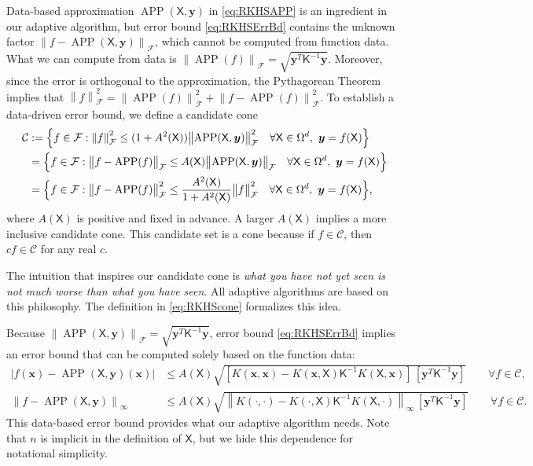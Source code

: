 \documentclass[]{mcom-l}
\theoremstyle{remark}
\DeclareMathOperator{\APP}{APP}
\newcommand{\mK}{\mathsf{K}}
\newcommand{\mX}{\mathsf{X}}
\newcommand{\bx}{{\boldsymbol{x}}}
\newcommand{\by}{{\boldsymbol{y}}}
\newcommand{\calc}{{\mathcal{C}}}
\newcommand{\calf}{{\mathcal{F}}}
\def\abs#1{\ensuremath{\left \lvert #1 \right \rvert}}
\newcommand{\norm}[2][{}]{\ensuremath{\left \lVert #2 \right \rVert}_{#1}}
\newcommand{\bignorm}[2][{}]{\ensuremath{\bigl \lVert #2 \bigr \rVert}_{#1}}
\begin{document}
Data-based approximation $\APP(\mX,\by)$ in \eqref{eq:RKHSAPP} is an ingredient in our adaptive algorithm, but error bound \eqref{eq:RKHSErrBd} contains the unknown factor $\norm[\calf]{f - \APP(\mX,\by)}$, which cannot be computed from function data.  What we can compute from data is $\bignorm[\calf]{\APP(f)} = \sqrt{\by^T \mK^{-1} \by}$.  Moreover, since the error is orthogonal to the approximation,  the Pythagorean Theorem implies that $\norm[\calf]{f}^2  = \bignorm[\calf]{\APP(f)}^2 + \bignorm[\calf]{f - \APP(f)}^2$.  To establish a data-driven error bound, we define a candidate cone
\begin{align} \label{eq:RKHScone}
\calc &:= \Bigl\{f \in \calf : \norm[\calf]{f}^2 \le (1 + A^2(\mX)) \bignorm[\calf]{\APP(\mX,\by)}^2 \quad \forall \mX \in \Omega^d, \ \by = f(\mX) \Bigr \} \\
\nonumber
& = \Bigl \{f \in \calf : \bignorm[\calf]{f - \APP(f)} \le A(\mX) \bignorm[\calf]{\APP(\mX,\by)} \quad \forall \mX \in \Omega^d, \ \by = f(\mX) \Bigr \} \\
\nonumber
& = \Bigl \{f \in \calf : \bignorm[\calf]{f - \APP(f)}^2 \le \frac{A^2(\mX)}{1 + A^2(\mX)} \bignorm[\calf]{f}^2 \quad \forall \mX \in \Omega^d, \ \by = f(\mX) \Bigr \},
\end{align}
where $A(\mX)$ is positive and fixed in advance.  A larger $A(\mX)$ implies a more inclusive candidate cone.  This candidate set is a cone because if $f \in \calc$, then $c f \in \calc$ for any real $c$. 

The intuition that inspires our candidate cone is \emph{what you have not yet seen is not much worse than what you have seen}. All adaptive algorithms are based on this philosophy. The definition in \eqref{eq:RKHScone} formalizes this idea. 

Because $\bignorm[\calf]{\APP(\mX,\by)} = \sqrt{\by^T \mK^{-1} \by}$, error bound \eqref{eq:RKHSErrBd} implies an error bound that can be computed solely based on the function data: 
\begin{subequations} \label{eq:DataErrBd}
\begin{align}
\label{eq:DataErrBdA}
    \abs{f(\bx) - \APP(\mX,\by)(\bx)} & \le   A(\mX) \sqrt{[K(\bx,\bx) - K(\bx,\mX) \mK^{-1} K(\mX,\bx) ] \, [\by^T \mK^{-1} \by] } \qquad \forall f \in \calc, \\
    \label{eq:DataErrBdB}
    \norm[\infty]{f - \APP(\mX,\by)} & \le   A(\mX) \sqrt{\norm[\infty]{K(\cdot,\cdot) - K(\cdot,\mX) \mK^{-1} K(\mX,\cdot)} \, [\by^T \mK^{-1} \by] } \qquad \forall f \in \calc.
\end{align}
\end{subequations}
This data-based error bound provides what  our adaptive algorithm needs.  Note that $n$ is implicit in the definition of $\mX$, but we hide this dependence for notational simplicity.
\end{document}
